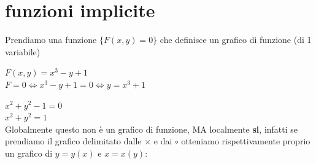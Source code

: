 \documentclass[a4paper, oneside]{article}
\begin{document}
\section{funzioni implicite}
Prendiamo una funzione $\{F(x,y) = 0\}$ che definisce un grafico di funzione (di 1 variabile)\\
\begin{example}
    $F(x,y) = x^3-y+1$\\
    $F=0 \Leftrightarrow x^3-y+1 = 0 \Leftrightarrow y = x^3+1$
\end{example}
\begin{example}
    $x^2+y^2-1 = 0$\\
    $x^2+y^2 = 1$\\
    Globalmente questo non è un grafico di funzione, MA localmente \textbf{si}, infatti se prendiamo il grafico delimitato dalle $\times$ e dai $\circ$ otteniamo rispettivamente proprio un grafico di $y = y(x)$ e $x = x(y)$:
    \begin{center}
    \end{center}
\end{example}
\end{document}

